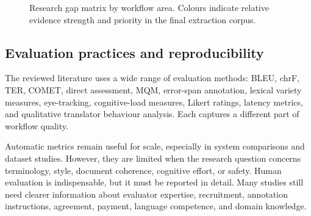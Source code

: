 \documentclass[11pt]{article}
\begin{document}
\begin{figure}[t]
\centering
{}
\caption{Research gap matrix by workflow area. Colours indicate relative evidence strength and priority in the final extraction corpus.}
\end{figure}

\subsection{Evaluation practices and reproducibility}
The reviewed literature uses a wide range of evaluation methods: BLEU, chrF, TER, COMET, direct assessment, MQM, error-span annotation, lexical variety measures, eye-tracking, cognitive-load measures, Likert ratings, latency metrics, and qualitative translator behaviour analysis. Each captures a different part of workflow quality.

Automatic metrics remain useful for scale, especially in system comparisons and dataset studies. However, they are limited when the research question concerns terminology, style, document coherence, cognitive effort, or safety. Human evaluation is indispensable, but it must be reported in detail. Many studies still need clearer information about evaluator expertise, recruitment, annotation instructions, agreement, payment, language competence, and domain knowledge.
\end{document}
